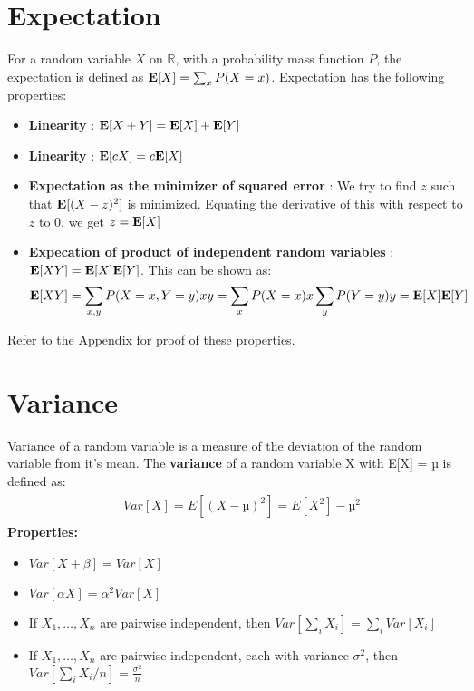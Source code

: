\documentclass[12pt]{article}
\begin{document}
\section{Expectation}
For a random variable $X$ on $\mathbb{R}$, with a probability mass function $P$, the expectation is defined as ${\bf E}[X]=\sum_{x} P(X=x)$. Expectation has the following properties:
\begin{itemize}
    \item \textbf{Linearity} : ${\bf E}[X+Y] = {\bf E}[X] + {\bf E}[Y]$
    \item \textbf{Linearity} : ${\bf E}[cX] = c{\bf E}[X]$
    \item \textbf{Expectation as the minimizer of squared error} : We try to find $z$ such that ${\bf E}[(X-z)^2]$ is minimized. Equating the derivative of this with respect to $z$ to $0$, we get $z={\bf E}[X]$
    \item \textbf{Expecation of product of independent random variables} : ${\bf E}[XY]={\bf E}[X]{\bf E}[Y]$. This can be shown as:
        \begin{equation*}
            {\bf E}[XY] = \sum_{x,y} P(X=x, Y=y)xy = \sum_x P(X=x)x \sum_y P(Y=y)y = {\bf E}[X]{\bf E}[Y]
        \end{equation*}
\end{itemize}

Refer to the Appendix for proof of these properties.

\section{Variance}
Variance of a random variable is a measure of the deviation of the random variable from it's mean. The \textbf{variance} of a random variable X with E[X] = µ is defined as:
    \begin{gather} 
        \begin{aligned}
         \quad   Var [X] = E [(X − µ)^2] = E [X^2 ] − µ^2
               \label{eqn:nonnegatie}
        \end{aligned}
    \end{gather}
     \textbf{Properties:}
    \begin{itemize}
        \item $Var [X + \beta ] = Var [X ]$
        \item $Var [\alpha X ] = \alpha^2 Var [X ]$
        \item If $X_1,\ldots,X_n$ are pairwise independent, then $Var[\sum_i X_i] = \sum_i Var[X_i]$
         \item If $X_1,\ldots,X_n$ are pairwise independent, each with variance $\sigma^2$, then $Var[\sum_i X_i / n] = \frac{\sigma^2}{n}$
    \end{itemize}
    
\end{document}

